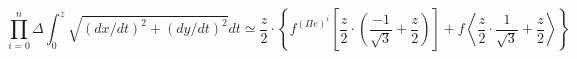 \[
    \prod_{i=0}^n
    \Delta
    \int_{0}^{z}\sqrt{ \left (dx/dt \right )^2+\left (dy/dt \right )^2} dt
    \simeq
    \frac{z}{2} \cdot
    \left \{
        f^{(\Pi e)^i}
        \left [
            \frac{z}{2} \cdot \left ( \frac{-1}{\sqrt{3}} + \frac{z}{2} \right )
        \right ]
        + f
        \left <
            \frac{z}{2} \cdot \frac{1}{\sqrt{3}} + \frac{z}{2}
        \right >
    \right \}
\]
